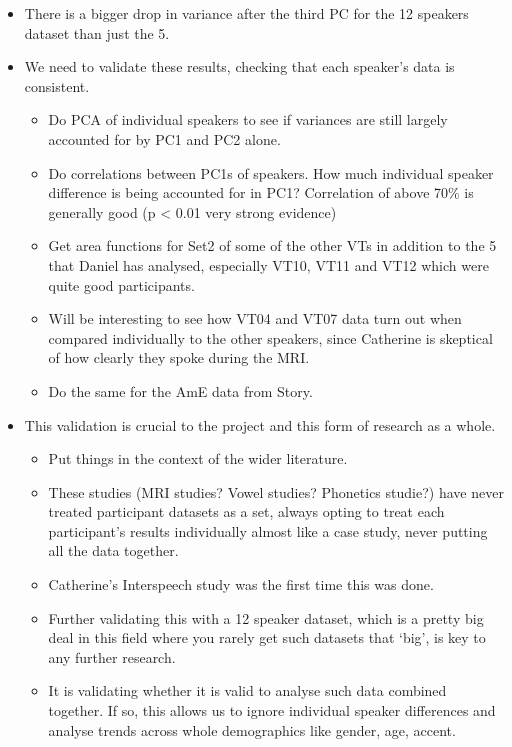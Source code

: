 \documentclass{article}
\begin{document}
\begin{itemize}
\begin{itemize}
\begin{itemize}
            \item There is a bigger drop in variance after the third PC for the 12 speakers dataset than just the 5.
            \item We need to validate these results, checking that each speaker's data is consistent.
            \begin{itemize}
                \item Do PCA of individual speakers to see if variances are still largely accounted for by PC1 and PC2 alone.
                \item Do correlations between PC1s of speakers. How much individual speaker difference is being accounted for in PC1? Correlation of above 70\% is generally good (p < 0.01 very strong evidence) 
                \item Get area functions for Set2 of some of the other VTs in addition to the 5 that Daniel has analysed, especially VT10, VT11 and VT12 which were quite good participants.
                \item Will be interesting to see how VT04 and VT07 data turn out when compared individually to the other speakers, since Catherine is skeptical of how clearly they spoke during the MRI.
                \item Do the same for the AmE data from Story.
            \end{itemize}
            \item This validation is crucial to the project and this form of research as a whole.
            \begin{itemize}
                \item Put things in the context of the wider literature.
                \item These studies (MRI studies? Vowel studies? Phonetics studie?) have never treated participant datasets as a set, always opting to treat each participant's results individually almost like a case study, never putting all the data together.
                \item Catherine's Interspeech study was the first time this was done.
                \item Further validating this with a 12 speaker dataset, which is a pretty big deal in this field where you rarely get such datasets that `big', is key to any further research.
                \item It is validating whether it is valid to analyse such data combined together. If so, this allows us to ignore individual speaker differences and analyse trends across whole demographics like gender, age, accent.

\end{itemize}
\end{itemize}
\end{itemize}
\end{itemize}
\end{document}
